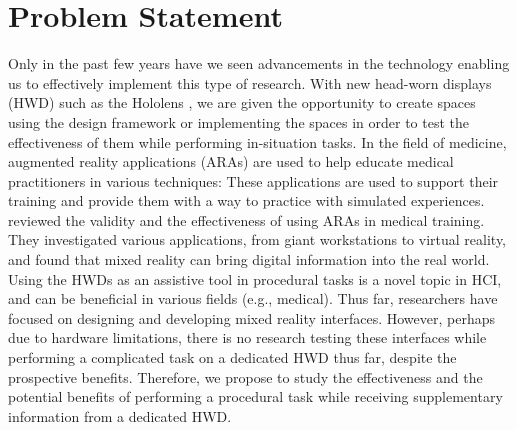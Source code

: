 \section{Problem Statement}
\label{sec:problemstatement}
Only in the past few years have we seen advancements in the technology enabling us to effectively implement this type of research. With new head-worn displays (HWD) such as the Hololens \cite{Hololens}, we are given the opportunity to create spaces using the design framework \cite{Ens2014a} or implementing the spaces in order to test the effectiveness of them while performing in-situation tasks.
In the field of medicine, augmented reality applications (ARAs) are used to help educate medical practitioners in various techniques: These applications are used to support their training and provide them with a way to practice with simulated experiences. \cite{Barsom2016} reviewed the validity and the effectiveness of using ARAs in medical training. They investigated various applications, from giant workstations to virtual reality, and found that mixed reality can bring digital information into the real world. Using the HWDs as an assistive tool in procedural tasks is a novel topic in HCI, and can be beneficial in various fields (e.g., medical). Thus far, researchers have focused on designing and developing mixed reality interfaces. However, perhaps due to hardware limitations, there is no research testing these interfaces while performing a complicated task on a dedicated HWD thus far, despite the prospective benefits. Therefore, we propose to study the effectiveness and the potential benefits of performing a procedural task while receiving supplementary information from a dedicated HWD. 